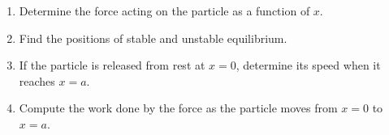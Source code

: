 \documentclass[12pt]{article}
\begin{document}
\begin{enumerate}
\begin{enumerate}
    \item Determine the force acting on the particle as a function of $x$.
    \item Find the positions of stable and unstable equilibrium.
    \item If the particle is released from rest at $x = 0$, determine its speed when it reaches $x = a$.
    \item Compute the work done by the force as the particle moves from $x = 0$ to $x = a$.
\end{enumerate}

\end{enumerate}
\end{document}
